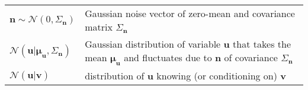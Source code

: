 \begin{table}
\begin{tabulary}{\textwidth}{l p{11cm}}
	$\boldsymbol{n} \sim \mathscr{N}(0,\Sigma_{\boldsymbol{n}}) $ & Gaussian noise vector of zero-mean and covariance matrix $ \Sigma_{\boldsymbol{n}} $\\		
	$\mathscr{N}(\boldsymbol{u}|\boldsymbol{\mu}_{\boldsymbol{u}},\Sigma_{\boldsymbol{n}}) $ & Gaussian distribution of variable $ \boldsymbol{u} $ that takes the mean $\boldsymbol{\mu}_{\boldsymbol{u}} $ and fluctuates due to $ \boldsymbol{n} $ of covariance $ \Sigma_{\boldsymbol{n}} $\\
	$\mathscr{N}(\boldsymbol{u}|\boldsymbol{v})$ & distribution of $ \boldsymbol{u} $ knowing (or conditioning on) $ \boldsymbol{v} $\\	\bottomrule
	\end{tabulary}
\end{table}